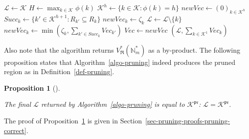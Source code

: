 \documentclass[
  11pt,
  a4paper,
]{article}
\theoremstyle{plain}
\theoremstyle{definition}
\theoremstyle{plain}
\theoremstyle{definition}
\theoremstyle{plain}
\newtheorem{proposition}{Proposition}[section]
\theoremstyle{remark}
\begin{document}
\begin{algorithm}[htb!]
\caption{\label{algo-pruning}Pruning of a complete $\mathfrak{R}$}
\begin{algorithmic}[1]
  \State $\mathcal{L}\gets\mathcal{K}$
  \State $ H \gets \max_{k\in\mathcal{K}} \phi(k)  $ 
    \State $\mathcal{K}^h\gets \{ k\in\mathcal{K} : \phi(k) =h  \}$
    \State $newVec\gets (0)_{k \in  \mathcal{K}^h}$
      \State $Succ_k \gets \{ k' \in  \mathcal{K}^{h+1} : R_{k'}\subseteq R_k\}$
        \State $newVec_k \gets \zeta_k$
      \Else
          \State $\mathcal{L}\gets \mathcal{L}\setminus \{ k \}$ 
        \EndIf
        \State $newVec_k \gets \min\left( \zeta_{k} ,  \sum_{k'\in Succ_k} Vec_{k'}   \right)$
      \EndIf
    \EndFor
    \State $Vec\gets newVec$
  \EndFor
  \State\Return $(\mathcal{L},\sum_{k\in\mathcal{K}^1} Vec_k  )$
\EndProcedure
\end{algorithmic}
\end{algorithm}

Also note that the algorithm returns
\(V^*_{\mathfrak{R}}(\mathbb{N}_m^*)\) as a by-product. The following
proposition states that Algorithm~\ref{algo-pruning} indeed produces the
pruned region as in Definition~\ref{def-pruning}.

\begin{proposition}[]\protect\hypertarget{prp-pruning-correct}{}\label{prp-pruning-correct}

The final \(\mathcal{L}\) returned by Algorithm~\ref{algo-pruning} is
equal to \(\mathcal{K}^{\mathfrak{pr}}\):
\(\mathcal{L}=\mathcal{K}^{\mathfrak{pr}}\).

\end{proposition}

The proof of Proposition~\ref{prp-pruning-correct} is given in
Section~\ref{sec-pruning-proofs-pruning-correct}.
\end{document}
